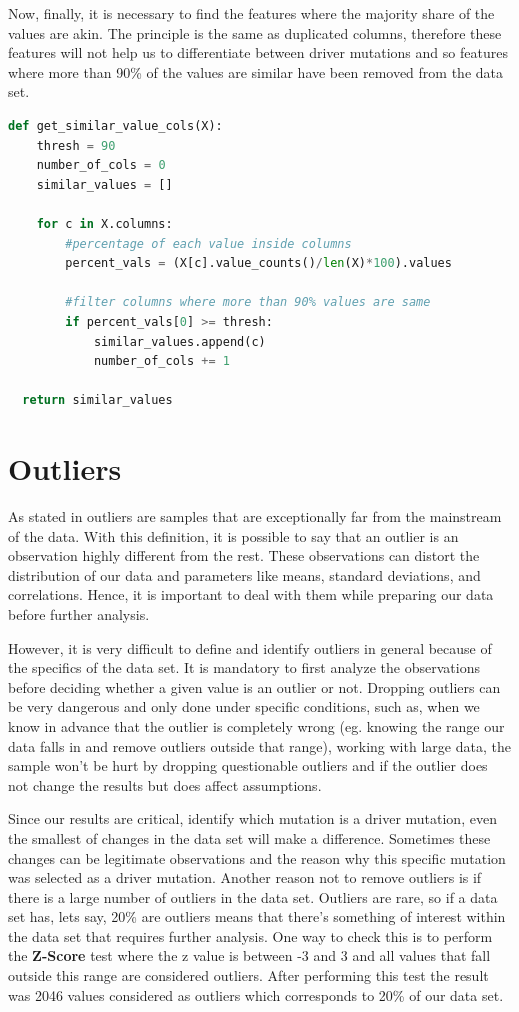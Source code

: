 Now, finally, it is necessary to find the features where the majority share of the values are akin. The principle is the same as duplicated columns, therefore these features will not help us to differentiate between driver mutations and so features where more than 90\% of the values are similar have been removed from the data set.

\begin{lstlisting}[language=Python]
def get_similar_value_cols(X):
    thresh = 90
    number_of_cols = 0
    similar_values = []
       
    for c in X.columns:
        #percentage of each value inside columns
        percent_vals = (X[c].value_counts()/len(X)*100).values
        
        #filter columns where more than 90% values are same
        if percent_vals[0] >= thresh:
            similar_values.append(c)
            number_of_cols += 1 
            
  return similar_values
\end{lstlisting}

\section{Outliers} %
\label{sec:outliners}
\hspace{10px} As stated in \cite{Kuhn} outliers are samples that are exceptionally far from the mainstream of the data. With this definition, it is possible to say that an outlier is an observation highly different from the rest. These observations can distort the distribution of our data and parameters like means, standard deviations, and correlations. Hence, it is important to deal with them while preparing our data before further analysis.

However, it is very difficult to define and identify outliers in general because of the specifics of the data set. It is mandatory to first analyze the observations before deciding whether a given value is an outlier or not. Dropping outliers can be very dangerous and only done under specific conditions, such as, when we know in advance that the outlier is completely wrong (eg. knowing the range our data falls in and remove outliers outside that range), working with large data, the sample won’t be hurt by dropping questionable outliers and if the outlier does not change the results but does affect assumptions. 

Since our results are critical, identify which mutation is a driver mutation, even the smallest of changes in the data set will make a difference. Sometimes these changes can be legitimate observations and the reason why this specific mutation was selected as a driver mutation. Another reason not to remove outliers is if there is a large number of outliers in the data set. Outliers are rare, so if a data set has, lets say, 20\% are outliers means that there's something of interest within the data set that requires further analysis. One way to check this is to perform the \textbf{Z-Score} test where the z value is between -3 and 3 and all values that fall outside this range are considered outliers. After performing this test the result was 2046 values considered as outliers
which corresponds to 20\% of our data set. 

